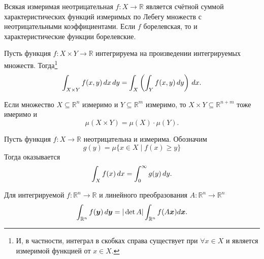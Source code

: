 
\begin{to_lem}
\label{5.103}
    Всякая измеримая неотрицательная $f \colon X \to \mathbb{R}$ является счётной суммой характеристических функций измеримых по Лебегу множеств с неотрицательными коэффициентами. Если $f$ борелевская, то и характеристические функции борелевские.
\end{to_lem}

\begin{to_thr}
    \label{thr_fub} %
    Пусть функция $f \colon X \times Y \to \mathbb{R}$ интегрируема на произведении интегрируемых множеств. Тогда\footnote{
        И, в частности, интеграл в скобках справа существует при $\forall x \in X$ и является измеримой функцией от $x \in X$.
    }
    $$
    \int_{X \times Y} f(x, y) \, d x \, d y = \int_X \left(
    \int_Y f(x, y) \, d y
    \right) \, d x.
    $$
\end{to_thr}


\begin{to_thr}
\label{xyxy} %
    Если множество $X \subseteq \mathbb{R}^n$ измеримо и $Y \subseteq \mathbb{R}^m$ измеримо, то $X \times Y \subseteq \mathbb{R}^{n + m}$ тоже имеримо и 
    $$
        \mu(X \times Y) = \mu (X) \cdot \mu (Y).
    $$
\end{to_thr}

\begin{to_thr}
\label{order_hor} %
    Пусть функция $f \colon X \to \mathbb{R}$ неотрицательна и измерима. Обозначим
    $$
        g(y) = \mu\{
        x \in X \mid f(x) \geq y
        \}
    $$
    Тогда оказывается
    $$
    \int_X f(x) \, d x = \int_0^{\infty} g(y) \, d y.
    $$
\end{to_thr}

\begin{to_thr}[\href{https://youtu.be/3P5iDswTCKM?t=2268}{Теорема о линейной замене переменных в интеграле Лебега}]
\label{lin_var}
    Для интегрируемой $f \colon \mathbb{R}^n \to \mathbb{R}$ и линейного преобразования $A \colon \mathbb{R}^n \to \mathbb{R}^n$
    $$
    \int_{\mathbb{R}^n} f(\mbox{\boldmath $y$}) \, d \mbox{\boldmath $y$} = | \det A | \int_{\mathbb{R}^n} f(A\mbox{\boldmath $x$}) d\mbox{\boldmath $x$}.
    $$
\end{to_thr}